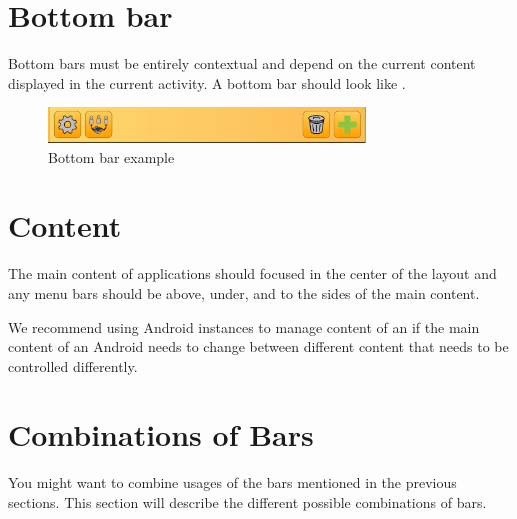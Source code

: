 \FloatBarrier


\section{Bottom bar}
Bottom bars must be entirely contextual and depend on the current content displayed in the current activity. A bottom bar should look like .


\begin{note}
\end{note}

\begin{figure}[!htbp]
    \centering
    \includegraphics[width=0.75\textwidth]{pictures/application_structure/bottombar}
    \caption{Bottom bar example}
    \label{fig:bottom_bar_example}
\end{figure}

\FloatBarrier


\section{Content}
The main content of applications should focused in the center of the layout and any menu bars should be above, under, and to the sides of the main content. 

\begin{note}
We recommend using Android  instances to manage content of an  if the main content of an Android  needs to change between different content that needs to be controlled differently. 
\end{note}

\FloatBarrier


\section{Combinations of Bars}
You might want to combine usages of the bars mentioned in the previous sections. This section will describe the different possible combinations of bars.

